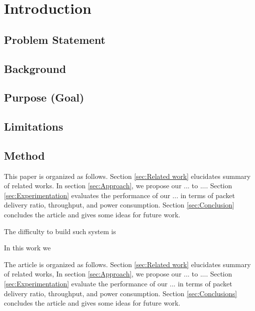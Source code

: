 \section{Introduction} \label{sec:Introduction}




\subsection{Problem Statement}

\subsection{Background}

\subsection{Purpose (Goal)}

\subsection{Limitations}

\subsection{Method}


This paper is organized as follows.
Section \ref{sec:Related work} elucidates summary of related works.
In section \ref{sec:Approach}, we propose our ... to ....
Section \ref{sec:Experimentation} evaluates the performance of our ... in terms of packet delivery ratio,
	throughput,
	and power consumption.
Section \ref{sec:Conclusion} concludes the article and gives some ideas for future work.






The difficulty to build such system is 


In this work we 

The article is organized as follows.
Section \ref{sec:Related work} elucidates summary of related works,
In section \ref{sec:Approach}, we propose our ... to ....
Section \ref{sec:Experimentation} evaluate the performance of our ... in terms of packet delivery ratio,
	throughput,
	and power consumption.
Section \ref{sec:Conclusions} concludes the article and gives some ideas for future work.




